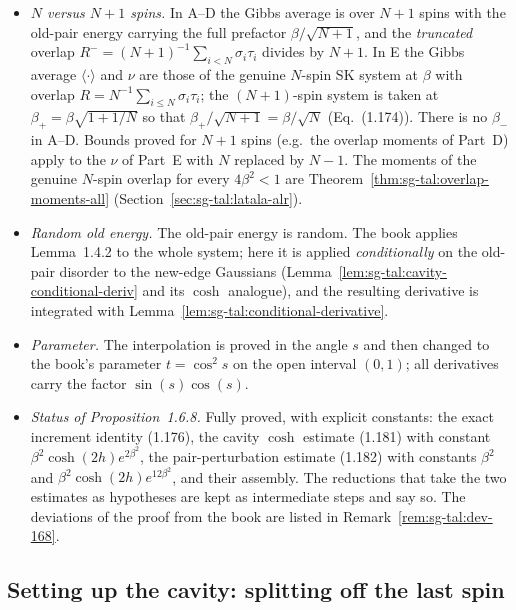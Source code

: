 \begin{remark}
\label{rem:sg-tal:dev-16}
\begin{itemize}
\item \emph{$N$ versus $N+1$ spins.}  In A--D the Gibbs average is over $N+1$ spins with
  the old-pair energy carrying the full prefactor $\beta/\sqrt{N+1}$, and the \emph{truncated}
  overlap $R^-=(N+1)^{-1}\sum_{i<N}\sigma_i\tau_i$ divides by $N+1$.  In E the Gibbs average
  $\langle\cdot\rangle$ and $\nu$ are those of the genuine $N$-spin SK system at $\beta$ with
  overlap $R=N^{-1}\sum_{i\le N}\sigma_i\tau_i$; the $(N+1)$-spin system is taken at
  $\beta_+=\beta\sqrt{1+1/N}$ so that $\beta_+/\sqrt{N+1}=\beta/\sqrt N$ (Eq.~(1.174)).  There is no
  $\beta_-$ in A--D.  Bounds proved for $N+1$ spins (e.g.\ the overlap moments of Part~D) apply to
  the $\nu$ of Part~E with $N$ replaced by $N-1$.  The moments of the genuine $N$-spin overlap for every $4\beta^2<1$ are
  Theorem~\ref{thm:sg-tal:overlap-moments-all} (Section~\ref{sec:sg-tal:latala-alr}).
\item \emph{Random old energy.}  The old-pair energy is random.  The book applies Lemma~1.4.2 to
  the whole system; here it is applied \emph{conditionally} on the old-pair disorder to the new-edge
  Gaussians (Lemma~\ref{lem:sg-tal:cavity-conditional-deriv} and its $\cosh$ analogue), and the resulting
  derivative is integrated with Lemma~\ref{lem:sg-tal:conditional-derivative}.
\item \emph{Parameter.}  The interpolation is proved in the angle $s$ and then changed to the book's
  parameter $t=\cos^2 s$ on the open interval $(0,1)$; all derivatives carry the factor
  $\sin(s)\cos(s)$.
\item \emph{Status of Proposition~1.6.8.}  Fully proved, with explicit constants: the exact increment
  identity (1.176), the cavity $\cosh$ estimate (1.181) with constant $\beta^2\cosh(2h)e^{2\beta^2}$, the
  pair-perturbation estimate (1.182) with constants $\beta^2$ and $\beta^2\cosh(2h)e^{12\beta^2}$, and their
  assembly.  The reductions that take the two estimates as hypotheses are kept as intermediate
  steps and say so.  The deviations of the proof from the book are listed in
  Remark~\ref{rem:sg-tal:dev-168}.
\end{itemize}
\end{remark}

\subsection{Setting up the cavity: splitting off the last spin}
\label{sec:sg-tal:cavity-setup}

